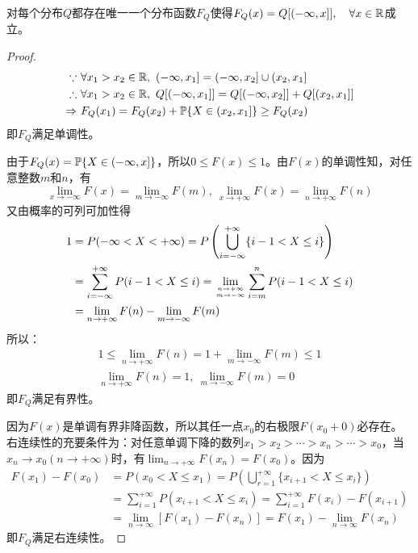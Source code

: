 
\begin{proposition}
    对每个分布$Q$都存在唯一一个分布函数$F_Q$使得$F_Q(x)=Q[(-\infty,x]], \quad \forall x \in \R$成立。
\end{proposition}
\begin{proof}
    \begin{align*}
        \because \      & \forall x_1>x_2 \in \mathbb{R},\ (-\infty,x_1]=(-\infty,x_2] \cup (x_2,x_1]     \\
        \therefore \    & \forall x_1>x_2 \in \mathbb{R},\ Q[(-\infty,x_1]]=Q[(-\infty,x_2]]+Q[(x_2,x_1]] \\
        \Rightarrow  \  & F_{Q}(x_1)=F_{Q}(x_2)+\P\{X\in(x_2,x_1]\}\ge F_{Q}(x_2)
    \end{align*}
    即$F_Q$满足单调性。

    由于$F_Q(x)=\P\{X\in(-\infty,x]\}$，所以$0\le F(x)\le 1$。由$F(x)$的单调性知，对任意整数$m$和$n$，有
    \[ \lim_{x \rightarrow-\infty} F(x)=\lim_{m \rightarrow-\infty} F(m),\ \lim_{x \rightarrow+\infty} F(x)=\lim_{n \rightarrow+\infty} F(n) \]
    又由概率的可列可加性得
    \begin{align*}
        1 & = P(-\infty<X<+\infty) = P\left(\bigcup_{i=-\infty}^{+\infty}\{i-1<X \le i\}\right)                                               \\
          & = \sum_{i=-\infty}^{+\infty} P(i-1<X \le i)=\lim_{n \rightarrow+\infty \atop m \rightarrow-\infty} \sum_{i =m}^{n} P(i-1<X \le i) \\
          & =\lim_{n \rightarrow+\infty} F(n)-\lim_{m \rightarrow-\infty} F(m)
    \end{align*}
    所以：
    \begin{gather}
        1 \le \lim_{n \rightarrow+\infty} F(n)=1+\lim_{m \rightarrow-\infty} F(m) \le 1 \\
        \lim_{n \rightarrow+\infty} F(n)=1 ,\ \lim_{m \rightarrow-\infty} F(m)=0
    \end{gather}
    即$F_Q$满足有界性。

    因为$F(x)$是单调有界非降函数，所以其任一点$x_0$的右极限$F(x_0+0)$必存在。右连续性的充要条件为：对任意单调下降的数列$x_1>x_2>\cdots>x_n>\cdots>x_0$，当$x_n \rightarrow x_0(n \rightarrow+\infty)$时，有$\lim _{n \rightarrow+\infty} F(x_n)=F(x_0)$。因为
    \begin{align*}
        F(x_1)-F(x_0) & =P(x_0 <X \le x_1)=P\left(\bigcup_{r=1}^{+\infty}\{x_{i+1}<X \le x_i\}\right)           \\
                      & =\sum_{i=1}^{+\infty} P(x_{i+1}<X \le x_i)=\sum_{i=1}^{+\infty}F(x_i)-F(x_{i+1})        \\
                      & =\lim _{n \rightarrow \infty}[F(x_1)-F(x_n)]=F(x_1)-\lim _{n \rightarrow \infty} F(x_n)
    \end{align*}
    即$F_Q$满足右连续性。
\end{proof}
